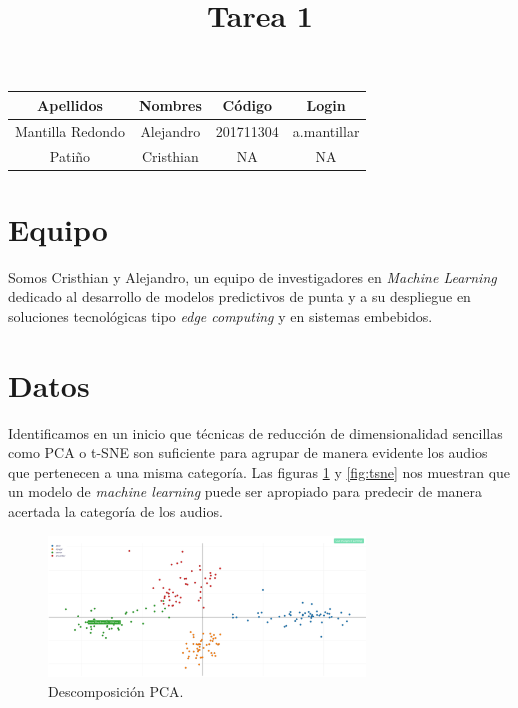 \documentclass[10pt]{article}
\begin{document}
\title{Tarea 1}
\date{}
\author{}
\maketitle
\vspace{-17ex}
\begin{table}[h]
\begin{center}
	\begin{tabular}{c c c c}
		\textbf{Apellidos} & \textbf{Nombres} & \textbf{Código} & \textbf{Login}\\
		\hline
		Mantilla Redondo & Alejandro & 201711304 & a.mantillar \\
		Patiño & Cristhian & NA & NA\\
		\hline
	\end{tabular}
\end{center}
\label{tab:Nombres}
\end{table}

\section*{Equipo}

Somos Cristhian y Alejandro, un equipo de investigadores en \textit{Machine Learning} dedicado al desarrollo de modelos predictivos de punta y a su despliegue en soluciones tecnológicas tipo \textit{edge computing} y en sistemas embebidos.

\section*{Datos}

Identificamos en un inicio que técnicas de reducción de dimensionalidad sencillas como PCA o t-SNE son suficiente para agrupar de manera evidente los audios que pertenecen a una misma categoría. Las figuras \ref{fig:PCA} y \ref{fig:tsne} nos muestran que un modelo de \textit{machine learning} puede ser apropiado para predecir de manera acertada la categoría de los audios.

\begin{figure}
    \centering
    \includegraphics[width=0.75\textwidth]{PCA Data explorer.png}
    \caption{Descomposición PCA.}
    \label{fig:PCA}
\end{figure}
\end{document}
